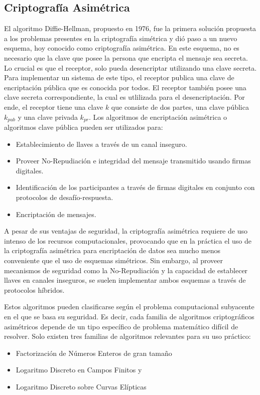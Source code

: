 \subsection{Criptografía Asimétrica}
El algoritmo Diffie-Hellman, propuesto en 1976, fue la primera solución propuesta a los problemas presentes en la criptografía simétrica y dió paso a un nuevo esquema, hoy conocido como criptografía asimétrica. En este esquema, no es necesario que la clave que posee la persona que encripta el mensaje sea secreta. Lo crucial es que el receptor, solo pueda desencriptar utilizando una clave secreta. Para implementar un sistema de este tipo, el receptor publica una clave de encriptación pública que es conocida por todos. El receptor también posee una clave secreta correspondiente, la cual es utlilizada para el desencriptación. Por ende, el receptor tiene una clave $k$ que consiste de dos partes, una clave pública $k_{pub}$ y una clave privada $k_{pr}$. Los algoritmos de encriptación asimétrica o algoritmos clave pública pueden ser utilizados para:
\begin{itemize}
    \item Establecimiento de llaves a través de un canal inseguro.
    \item Proveer No-Repudiación e integridad del mensaje transmitido usando firmas digitales.
    \item Identificación de los participantes a través de firmas digitales en conjunto con protocolos de desafío-respuesta.
    \item Encriptación de mensajes.
\end{itemize}
A pesar de sus ventajas de seguridad, la criptografía asimétrica requiere de uso intenso de los recursos computacionales, provocando que en la práctica el uso de la criptografía asimétrica para encriptación de datos sea mucho menos conveniente que el uso de esquemas simétricos. Sin embargo, al proveer mecanismos de seguridad como la No-Repudiación y la capacidad de establecer llaves en canales inseguros, se suelen implementar ambos esquemas a través de protocolos híbridos. 

Estos algoritmos pueden clasificarse según el problema computacional subyacente en el que se basa su seguridad. Es decir, cada familia de algoritmos criptográficos asimétricos depende de un tipo específico de problema matemático difícil de resolver. Solo existen tres familias de algoritmos relevantes para su uso práctico:
\begin{itemize}
    \item Factorización de Números Enteros de gran tamaño
    \item Logaritmo Discreto en Campos Finitos y
    \item Logaritmo Discreto sobre Curvas Elípticas
\end{itemize}

